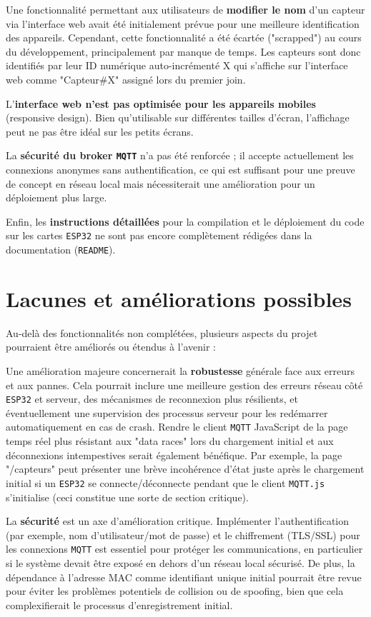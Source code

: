 \documentclass[12pt]{article}
\begin{document}
Une fonctionnalité permettant aux utilisateurs de \textbf{modifier le nom} d'un capteur via l'interface web avait été initialement prévue pour une meilleure identification des appareils. Cependant, cette fonctionnalité a été écartée ("scrapped") au cours du développement, principalement par manque de temps. Les capteurs sont donc identifiés par leur ID numérique auto-incrémenté X qui s'affiche sur l'interface web comme "Capteur\#X" assigné lors du premier join.

L'\textbf{interface web n'est pas optimisée pour les appareils mobiles} (responsive design). Bien qu'utilisable sur différentes tailles d'écran, l'affichage peut ne pas être idéal sur les petits écrans.

La \textbf{sécurité du broker \texttt{MQTT}} n'a pas été renforcée ; il accepte actuellement les connexions anonymes sans authentification, ce qui est suffisant pour une preuve de concept en réseau local mais nécessiterait une amélioration pour un déploiement plus large.

Enfin, les \textbf{instructions détaillées} pour la compilation et le déploiement du code sur les cartes \texttt{ESP32} ne sont pas encore complètement rédigées dans la documentation (\texttt{README}).

\section{Lacunes et améliorations possibles}

Au-delà des fonctionnalités non complétées, plusieurs aspects du projet pourraient être améliorés ou étendus à l'avenir :

Une amélioration majeure concernerait la \textbf{robustesse} générale face aux erreurs et aux pannes. Cela pourrait inclure une meilleure gestion des erreurs réseau côté \texttt{ESP32} et serveur, des mécanismes de reconnexion plus résilients, et éventuellement une supervision des processus serveur pour les redémarrer automatiquement en cas de crash. Rendre le client \texttt{MQTT} JavaScript de la page temps réel plus résistant aux "data races" lors du chargement initial et aux déconnexions intempestives serait également bénéfique. Par exemple, la page "/capteurs" peut présenter une brève incohérence d'état juste après le chargement initial si un \texttt{ESP32} se connecte/déconnecte pendant que le client \texttt{MQTT.js} s'initialise (ceci constitue une sorte de section critique).

La \textbf{sécurité} est un axe d'amélioration critique. Implémenter l'authentification (par exemple, nom d'utilisateur/mot de passe) et le chiffrement (TLS/SSL) pour les connexions \texttt{MQTT} est essentiel pour protéger les communications, en particulier si le système devait être exposé en dehors d'un réseau local sécurisé. De plus, la dépendance à l'adresse MAC comme identifiant unique initial pourrait être revue pour éviter les problèmes potentiels de collision ou de spoofing, bien que cela complexifierait le processus d'enregistrement initial.
\end{document}
